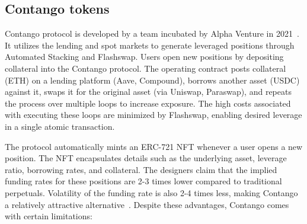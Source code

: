 \subsection{Contango tokens}\label{subsec:contango}
Contango protocol is developed by a team incubated by Alpha Venture in 2021~\cite{Contango_Blog}. It utilizes the lending and spot markets to generate leveraged positions through Automated Stacking and Flashswap. Users open new positions by depositing collateral into the Contango protocol. The operating contract posts collateral (ETH) on a lending platform (Aave, Compound), borrows another asset (USDC) against it, swaps it for the original asset (via Uniswap, Paraswap), and repeats the process over multiple loops to increase exposure. The high costs associated with executing these loops are minimized by Flashswap, enabling desired leverage in a single atomic transaction.

The protocol automatically mints an ERC-721 NFT whenever a user opens a new position. The NFT encapsulates details such as the underlying asset, leverage ratio, borrowing rates, and collateral. The designers claim that the implied funding rates for these positions are 2-3 times lower compared to traditional perpetuals. Volatility of the funding rate is also 2-4 times less,  making Contango a relatively attractive alternative~\cite{Contango_Doc,Contango_Medium}. Despite these advantages, Contango comes with certain limitations:

